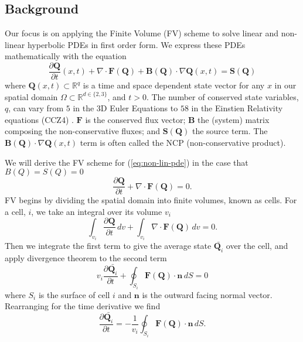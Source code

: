 \subsection{Background}
Our focus is on applying the Finite Volume (FV) scheme to solve linear and non-linear hyperbolic PDEs in first order form.
We express these PDEs mathematically with the equation
\begin{equation}\label{eq:non-lin-pde}
    \frac{\partial \mathbf{Q}}{\partial t}(x,t) + \nabla \cdot \mathbf{F}(\mathbf{Q}) + \mathbf{B}(\mathbf{Q}) \cdot \nabla \mathbf{Q}(x,t) = \mathbf{S}(\mathbf{Q})
\end{equation}
where $\mathbf{Q}(x,t)\subset \mathbb{R}^q$ is a time and space dependent state vector for any $x$ in our spatial domain $\Omega\subset \mathbb{R}^{d \in \{2,3\}}$, and $t>0$.
The number of conserved state variables, $q$, can vary from $5$ in the 3D Euler Equations to $58$ in the Einstien Relativity equations (CCZ4) \cite{CCZ4}.
$\mathbf{F}$ is the conserved flux vector;
$\mathbf{B}$ the (system) matrix composing the non-conservative fluxes;
and $\mathbf{S}(\mathbf{Q})$ the source term.
The $\mathbf{B}(\mathbf{Q}) \cdot \nabla \mathbf{Q}(x,t)$ term is often called the NCP (non-conservative product).


We will derive the FV scheme for  (\ref{eq:non-lin-pde}) in the case that $B(Q)=S(Q)=0$
\begin{equation*}
    \frac{\partial \mathbf{Q}}{\partial t} + \nabla\cdot \mathbf{F}(\mathbf{Q}) = 0.
\end{equation*}
FV begins by dividing the spatial domain into finite volumes, known as cells.
For a cell, $i$, we take an integral over its volume $v_i$
\begin{equation*}
    \int_{v_i}\frac{\partial \mathbf{Q}}{\partial t}\,dv + \int_{v_i}\nabla\cdot \mathbf{F}(\mathbf{Q})\,dv = 0.
\end{equation*}
Then we integrate the first term to give the average state $\bar{\mathbf{Q}_i}$ over the cell, and apply divergence theorem to the second term
\begin{equation*}
    v_i\frac{\partial \bar{\mathbf{Q}_i}}{\partial t} + \oint_{S_i}\mathbf{F}(\mathbf{Q})\cdot \mathbf{n} \, dS = 0
\end{equation*}
where $S_i$ is the surface of cell $i$ and $\mathbf{n}$ is the outward facing normal vector.
Rearranging for the time derivative we find
\begin{equation*}
   \frac{\partial \bar{\mathbf{Q}_i}}{\partial t} = -\frac{1}{v_i} \oint_{S_i}\mathbf{F}(\mathbf{Q})\cdot \mathbf{n} \, dS.
\end{equation*}

